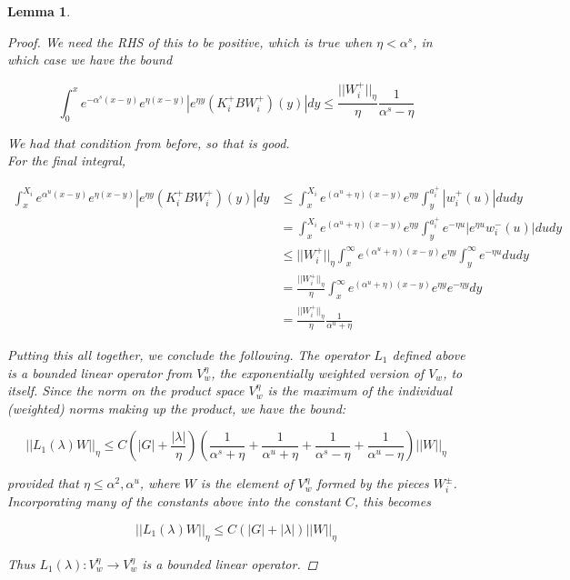 \documentclass[12pt]{article}
\newtheorem{lemma}{Lemma}
\begin{document}
\begin{lemma}
\begin{proof}
We need the RHS of this to be positive, which is true when $\eta < \alpha^s$, in which case we have the bound

\[  
\int_0^x e^{-\alpha^s (x-y)}e^{\eta(x-y)}|e^{\eta y} (K_i^+ B W_i^+)(y)| dy \leq
\frac{||W_i^+||_\eta}{\eta} \frac{1}{\alpha^s - \eta} 
\]

We had that condition from before, so that is good.\\

For the final integral,

\begin{align*}
\int_x^{X_i} e^{\alpha^u (x-y)}e^{\eta(x-y)}|e^{\eta y} (K_i^+ B W_i^+)(y)| dy &\leq \int_x^{X_i} e^{(\alpha^u + \eta)(x-y)}e^{\eta y} \int_y^{a_i^+} |w_i^+(u)| du dy \\
&= \int_x^{X_i} e^{(\alpha^u + \eta)(x-y)}e^{\eta y} \int_y^{a_i^+} e^{-\eta u} |e^{\eta u} w_i^-(u)| du dy \\
&\leq ||W_i^+||_\eta \int_x^\infty e^{(\alpha^u + \eta)(x-y)}e^{\eta y} \int_y^\infty e^{-\eta u} du dy \\
&= \frac{||W_i^+||_\eta}{\eta} \int_x^\infty e^{(\alpha^u + \eta)(x-y)}e^{\eta y} e^{-\eta y} dy \\
&= \frac{||W_i^+||_\eta}{\eta} \frac{1}{\alpha^u + \eta}
\end{align*}

Putting this all together, we conclude the following. The operator $L_1$ defined above is a bounded linear operator from $V_w^\eta$, the exponentially weighted version of $V_w$, to itself. Since the norm on the product space $V_w^\eta$ is the maximum of the individual (weighted) norms making up the product, we have the bound:

\begin{equation}
	||L_1(\lambda)W||_\eta \leq C\left(|G| + \frac{|\lambda|}{\eta}\right)\left(\frac{1}{\alpha^s + \eta} + \frac{1}{\alpha^u + \eta} + \frac{1}{\alpha^s - \eta} + \frac{1}{\alpha^u - \eta}\right)||W||_\eta
\end{equation}

provided that $\eta \leq \alpha^2, \alpha^u$, where $W$ is the element of $V_w^\eta$ formed by the pieces $W_i^\pm$. Incorporating many of the constants above into the constant $C$, this becomes

\begin{equation}
||L_1(\lambda)W||_\eta \leq C\left(|G| +|\lambda|\right)||W||_\eta
\end{equation}

Thus $L_1(\lambda): V_w^\eta \rightarrow V_w^\eta$ is a bounded linear operator. 


\end{proof}
\end{lemma}
\end{document}
